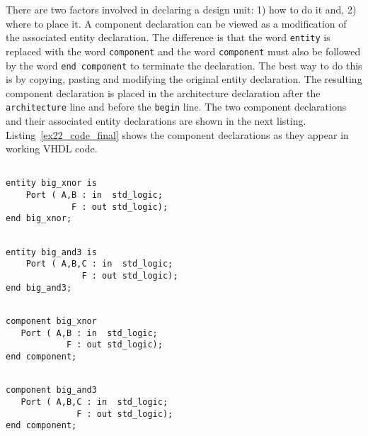 There are two factors involved in declaring a design unit: 1) how to do it and, 2) where to place it. A component declaration can be viewed as a modification of the associated entity declaration. The difference is that the word \texttt{entity} is replaced with the word \texttt{component} and the word \texttt{component} must also be followed by the word \texttt{end component} to terminate the declaration. The best way to do this is by copying, pasting and modifying the original entity declaration. The resulting component declaration is placed in the architecture declaration after the \texttt{architecture} line and before the \texttt{begin} line. The two component declarations and their associated entity declarations are shown in the next listing. Listing~\ref{ex22_code_final} shows the component declarations as they appear in working VHDL code.

\noindent
\begin{minipage}[t]{0.48\textwidth}
\vspace{0pt}
\noindent
\begin{lstlisting}[]

entity big_xnor is
    Port ( A,B : in  std_logic;
             F : out std_logic);
end big_xnor;
\end{lstlisting}
\begin{lstlisting}[]

entity big_and3 is
    Port ( A,B,C : in  std_logic;
               F : out std_logic);
end big_and3;
\end{lstlisting}
\end{minipage}
\begin{minipage}[t]{0.48\textwidth}
\vspace{0pt}\raggedright
\begin{lstlisting}[]

component big_xnor
   Port ( A,B : in  std_logic;
            F : out std_logic);
end component;
\end{lstlisting}
\begin{lstlisting}[]

component big_and3
   Port ( A,B,C : in  std_logic;
              F : out std_logic);
end component;
\end{lstlisting}
\end{minipage}

